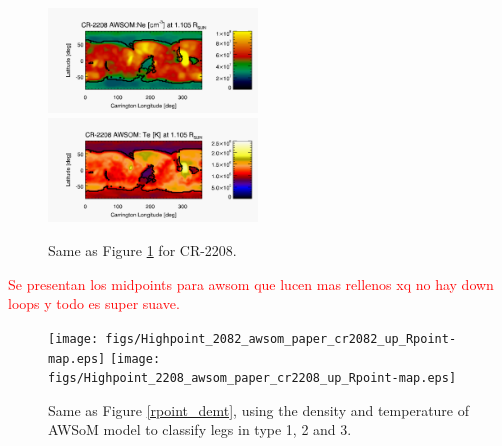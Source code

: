 \documentclass[namedreferences]{solarphysics}
\begin{document}
\begin{article}
\begin{figure}[h!]
\begin{center}
\includegraphics[width=0.495\textwidth]{figs/map_Ne_awsom_2208_185_short_1105_Rsun.pdf}
\includegraphics[width=0.495\textwidth]{figs/map_Te_awsom_2208_185_short_1105_Rsun.pdf}
\caption{Same as Figure \ref{carmaps_awsom_2208} for CR-2208.}
\label{carmaps_awsom_2208}
\end{center}
\end{figure}

\textcolor{red}{Se presentan los midpoints para awsom que lucen mas rellenos xq no hay down loops y todo es super suave.}

\begin{figure}[h!]
\begin{center}
\texttt{[image: figs/Highpoint\_2082\_awsom\_paper\_cr2082\_up\_Rpoint-map.eps]}
\texttt{[image: figs/Highpoint\_2208\_awsom\_paper\_cr2208\_up\_Rpoint-map.eps]}
\caption{Same as Figure \ref{rpoint_demt}, using the density and temperature of AWSoM model to classify legs in type 1, 2 and 3.}
\label{rpoint_awsom}
\end{center}
\end{figure} 


\end{article}
\end{document}
